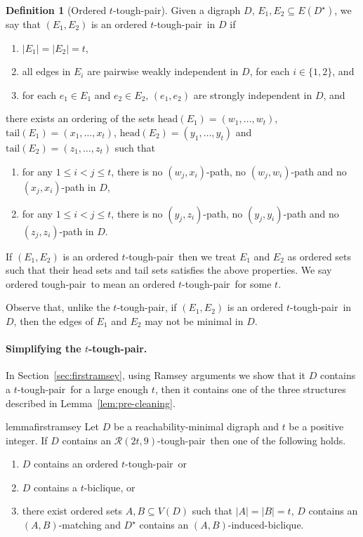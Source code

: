 \documentclass[a4paper,11pt]{article}
\theoremstyle{plain}
\newtheorem{identification rule}{Identification Rule}
\theoremstyle{definition}
\newtheorem{definition}[theorem]{Definition}
\theoremstyle{remark}
\newcommand{\toughpair}{tough-pair}
\newcommand{\head}{\text{head}}
\newcommand{\tail}{\text{tail}}
\begin{document}
\begin{definition}[Ordered $t$-\toughpair]
Given a 
digraph $D$, $E_1, E_2 \subseteq E(D^{\star})$, we say that $(E_1,E_2)$ is an ordered $t$-\toughpair\  in $D$ if 
\begin{enumerate}
\item $|E_1| = |E_2|=t$,
\item all edges in $E_i$ are pairwise weakly independent in $D$, for each $i \in \{1,2\}$, and
\item for each $e_1 \in E_1$ and $e_2 \in E_2$, $(e_1,e_2)$ are strongly independent in $D$, and
\end{enumerate}
there exists an ordering of the sets $\head(E_1) = (w_1, \ldots, w_t)$, $\tail(E_1)=(x_1, \ldots, x_t)$, $\head(E_2)=(y_1, \ldots, y_t)$ and $\tail(E_2)=(z_1, \ldots, z_t)$ such that
\begin{enumerate}
\item for any $1\leq i < j \leq t$, there is no $(w_j,x_i)$-path, no $(w_j,w_i)$-path and no $(x_j,x_i)$-path in $D$,
\item for any $1\leq i < j \leq t$, there is no $(y_j,z_i)$-path, no $(y_j,y_i)$-path and no $(z_j,z_i)$-path in $D$.
\end{enumerate}
If $(E_1,E_2)$ is an ordered $t$-\toughpair\ then we treat $E_1$ and $E_2$ as ordered sets such that their head sets and tail sets satisfies the above properties. We say ordered \toughpair\ to mean an ordered $t$-\toughpair\ for some $t$.
\end{definition}

Observe that, unlike the $t$-\toughpair, if $(E_1,E_2)$ is an ordered $t$-\toughpair\ in $D$, then the edges of $E_1$ and $E_2$ may not be minimal in $D$.

\paragraph*{Simplifying the $t$-\toughpair.}
In Section~\ref{sec:firstramsey}, using Ramsey arguments we show that it $D$ contains a $t$-\toughpair\ for a large enough $t$, then it contains one of the three structures described in Lemma~\ref{lem:pre-cleaning}.

\begin{restatable}{lemma}{firstramsey}\label{lem:pre-cleaning}
Let $D$ be a reachability-minimal digraph and $t$ be a positive integer. 
If $D$ contains an $\mathcal{R}(2t,9)$-\toughpair\
then one of the following holds.
\begin{enumerate}
\item $D$ contains an ordered $t$-\toughpair\, or
\item $D$ contains a $t$-biclique, or
\item there exist ordered sets $A,B \subseteq V(D)$ such that $|A|=|B|=t$, $D$ contains an $(A,B)$-matching and $D^{\star}$ contains an $(A,B)$-induced-biclique. 
\end{enumerate}
\end{restatable}
\end{document}

